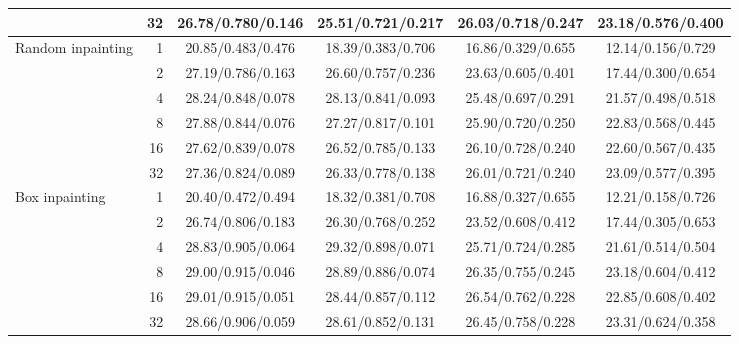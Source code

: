 \begin{table}[t]
\begin{tabular}{lrcccc}
 & 32 & 26.78/0.780/0.146 & 25.51/0.721/0.217 & 26.03/0.718/0.247 & 23.18/0.576/0.400 \\
\midrule
Random inpainting & 1 & 20.85/0.483/0.476 & 18.39/0.383/0.706 & 16.86/0.329/0.655 & 12.14/0.156/0.729 \\
 & 2 & 27.19/0.786/0.163 & 26.60/0.757/0.236 & 23.63/0.605/0.401 & 17.44/0.300/0.654 \\
 & 4 & 28.24/0.848/0.078 & 28.13/0.841/0.093 & 25.48/0.697/0.291 & 21.57/0.498/0.518 \\
 & 8 & 27.88/0.844/0.076 & 27.27/0.817/0.101 & 25.90/0.720/0.250 & 22.83/0.568/0.445 \\
 & 16 & 27.62/0.839/0.078 & 26.52/0.785/0.133 & 26.10/0.728/0.240 & 22.60/0.567/0.435 \\
 & 32 & 27.36/0.824/0.089 & 26.33/0.778/0.138 & 26.01/0.721/0.240 & 23.09/0.577/0.395 \\
\midrule
Box inpainting & 1 & 20.40/0.472/0.494 & 18.32/0.381/0.708 & 16.88/0.327/0.655 & 12.21/0.158/0.726 \\
 & 2 & 26.74/0.806/0.183 & 26.30/0.768/0.252 & 23.52/0.608/0.412 & 17.44/0.305/0.653 \\
 & 4 & 28.83/0.905/0.064 & 29.32/0.898/0.071 & 25.71/0.724/0.285 & 21.61/0.514/0.504 \\
 & 8 & 29.00/0.915/0.046 & 28.89/0.886/0.074 & 26.35/0.755/0.245 & 23.18/0.604/0.412 \\
 & 16 & 29.01/0.915/0.051 & 28.44/0.857/0.112 & 26.54/0.762/0.228 & 22.85/0.608/0.402 \\
 & 32 & 28.66/0.906/0.059 & 28.61/0.852/0.131 & 26.45/0.758/0.228 & 23.31/0.624/0.358 \\
\bottomrule
\end{tabular}
\end{table}

